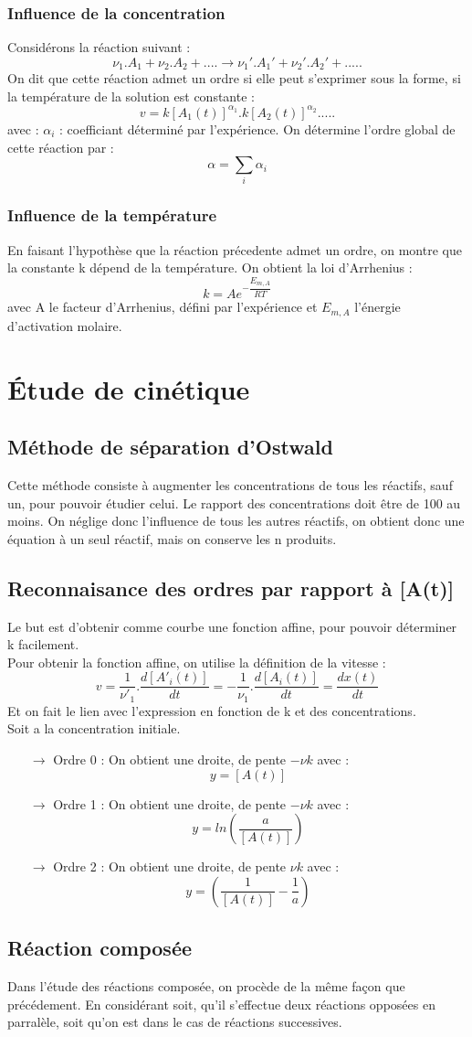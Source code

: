 \subsubsection{Influence de la concentration}
\begin{de}
Considérons la réaction suivant :
$$\nu_1.A_1 + \nu_2.A_2 + .... \rightarrow \nu_1'.A_1' + \nu_2'.A_2' + .....$$
On dit que cette réaction admet un ordre si elle peut s'exprimer sous la forme, si la température de la solution est constante :
$$v = k[A_1(t)]^{\alpha_1}.k[A_2(t)]^{\alpha_2}.....$$ 
avec : $\alpha_i$ : coefficiant déterminé par l'expérience. On détermine l'ordre global de cette réaction par :
$$\alpha = \sum_i \alpha_i$$
\end{de}
\subsubsection{Influence de la température}
En faisant l'hypothèse que la réaction précedente admet un ordre, on montre que la constante k dépend de la température. On obtient la loi d'Arrhenius :
$$k = Ae^{-\dfrac{E_{m,A}}{RT}}$$
avec A le facteur d'Arrhenius, défini par l'expérience et $E_{m,A}$ l'énergie d'activation molaire.
\section{Étude de cinétique}
\subsection{Méthode de séparation d'Ostwald}
Cette méthode consiste à augmenter les concentrations de tous les réactifs, sauf un, pour pouvoir étudier celui. Le rapport des concentrations doit être de 100 au moins. On néglige donc l'influence de tous les autres réactifs, on obtient donc une équation à un seul réactif, mais on conserve les n produits.
\subsection{Reconnaisance des ordres par rapport à [A(t)]}
Le but est d'obtenir comme courbe une fonction affine, pour pouvoir déterminer k facilement.\\
Pour obtenir la fonction affine, on utilise la définition de la vitesse :
$$v = \dfrac{1}{\nu'_1}.\dfrac{d[A'_i(t)]}{dt} = -\dfrac{1}{\nu_1}.\dfrac{d[A_i(t)]}{dt} = \dfrac{dx(t)}{dt}$$
Et on fait le lien avec l'expression en fonction de k et des concentrations.\\
Soit a la concentration initiale.
\begin{itemize}
 \item[$\rightarrow$] Ordre 0 : On obtient une droite, de pente $-\nu k$ avec : $$y = [A(t)]$$
 \item[$\rightarrow$] Ordre 1 : On obtient une droite, de pente $-\nu k$ avec : $$y = ln\left( \dfrac{a}{[A(t)]}\right) $$
 \item[$\rightarrow$] Ordre 2 : On obtient une droite, de pente $\nu k$ avec : $$y = \left( \frac{1}{[A(t)]} - \frac{1}{a}\right) $$
\end{itemize}
\subsection{Réaction composée}
Dans l'étude des réactions composée, on procède de la même façon que précédement. En considérant soit, qu'il s'effectue deux réactions opposées en parralèle, soit qu'on est dans le cas de réactions successives.
